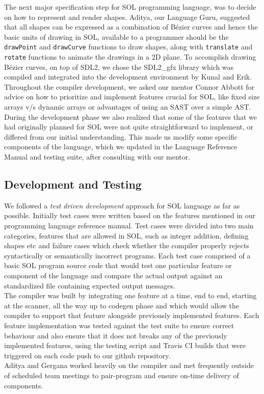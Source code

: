 \documentclass[letterpaper,12pt]{report}
\begin{document}
      The next major specification step for SOL programming language, was to decide on how to represent and render shapes. Aditya, our Language Guru, suggested that all shapes can be expressed as a combination of B\'ezier curves and hence the basic units of drawing in SOL, available to a programmer should be the \texttt{drawPoint} and \texttt{drawCurve} functions to draw shapes, along with \texttt{translate} and \texttt{rotate} functions to animate the drawings in a 2D plane. To accomplish drawing B\'ezier curves, on top of SDL2, we chose the SDL2\_gfx library which was compiled and integrated into the development environment by Kunal and Erik.\\

      Throughout the compiler development, we asked our mentor Connor Abbott for advice on how to prioritize  and implement features crucial for SOL, like fixed size arrays v/s dynamic arrays or advantages of using an SAST over a simple AST. During the development phase we also realized that some of the features that we had originally planned for SOL were not quite straightforward to implement, or differed from our initial understanding. This made us modify some specific components of the language, which we updated in the Language Reference Manual and testing suite, after consulting with our mentor.

    \subsection{Development and Testing}
      We followed a \textit{test driven development} approach for SOL language as far as possible. Initially test cases were written based on the features mentioned in our programming language reference manual. Test cases were divided into two main categories, features that are allowed in SOL, such as integer addition, defining shapes etc and failure cases which check whether the compiler properly rejects syntactically or semantically incorrect programs. Each test case comprised of a basic SOL program source code that would test one particular feature or component of the language and compare the actual output against an standardized file containing expected output messages.\\

      The compiler was built by integrating one feature at a time, end to end, starting at the scanner, all the way up to codegen phase and which would allow the compiler to support that feature alongside previously implemented features. Each feature implementation was tested against the test suite to ensure correct behaviour and also ensure that it does not breaks any of the previously implemented features, using the testing script and Travis CI builds that were triggered on each code push to our github repository.\\
      Aditya and Gergana worked heavily on the compiler and met frequently outside of scheduled team meetings to pair-program and ensure on-time delivery of components.\\
\end{document}
